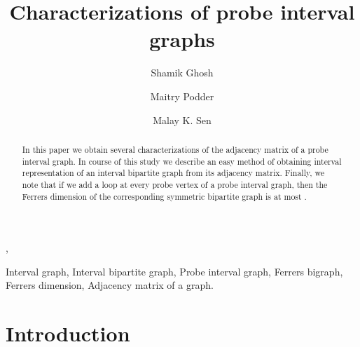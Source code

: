 \documentclass[secthm]{elsart}
\begin{document}
\pagestyle{headings}

\begin{frontmatter}

\title{Characterizations of probe interval graphs}

\author{Shamik Ghosh}
,
\author{Maitry Podder}

\address{Department of Mathematics, Jadavpur University, Kolkata - 700 032, India.}

\author{Malay K. Sen}

\address{Department of Mathematics, North Bengal University,
   Darjeeling, West Bengal, India, Pin - 734 430.}



\begin{abstract}
In this paper we obtain several characterizations of the adjacency matrix of a probe interval graph. In course of this study we describe an easy method of obtaining interval representation of an interval bipartite graph from its adjacency matrix. Finally, we note that if we add a loop at every probe vertex of a probe interval graph, then the Ferrers dimension of the corresponding symmetric bipartite graph is at most . 
\end{abstract}

\begin{keyword}
Interval graph, Interval bipartite graph, Probe interval graph, Ferrers bigraph, Ferrers dimension, Adjacency matrix of a graph.
\end{keyword}

\end{frontmatter}

\section{Introduction}
\end{document}
